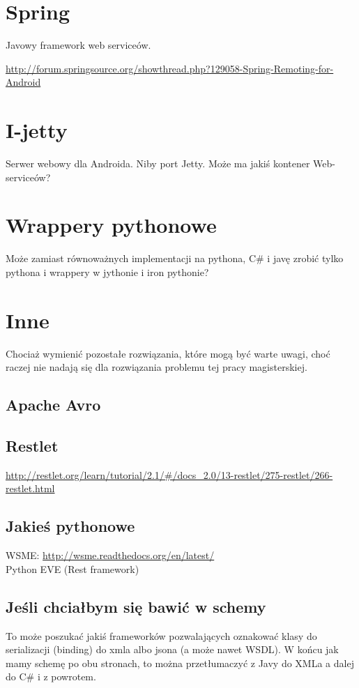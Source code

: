 \section{Spring}
Javowy framework web serviceów.

\url{http://forum.springsource.org/showthread.php?129058-Spring-Remoting-for-Android}\\


\section{I-jetty}
Serwer webowy dla Androida. Niby port Jetty. Może ma jakiś kontener Web-serviceów?

\section{Wrappery pythonowe}
Może zamiast równoważnych implementacji na pythona, C\# i javę zrobić tylko pythona i wrappery w jythonie i iron pythonie?


\section{Inne}
Chociaż wymienić pozostałe rozwiązania, które mogą być warte uwagi, choć raczej nie nadają się dla rozwiązania problemu tej pracy magisterskiej.

\subsection{Apache Avro}

\subsection{Restlet}
\url{http://restlet.org/learn/tutorial/2.1/#/docs_2.0/13-restlet/275-restlet/266-restlet.html}\\

\subsection{Jakieś pythonowe}
WSME: \url{http://wsme.readthedocs.org/en/latest/}\\
Python EVE (Rest framework)\\

\subsection{Jeśli chciałbym się bawić w schemy}
To może poszukać jakiś frameworków pozwalających oznakować klasy do serializacji (binding) do xmla albo jsona (a może nawet WSDL).
W końcu jak mamy schemę po obu stronach, to można przetłumaczyć z Javy do XMLa a dalej do C\# i z powrotem.

